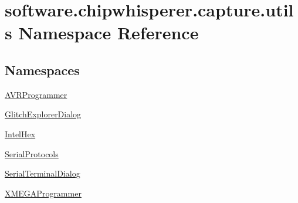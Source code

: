 \hypertarget{namespacesoftware_1_1chipwhisperer_1_1capture_1_1utils}{}\section{software.\+chipwhisperer.\+capture.\+utils Namespace Reference}
\label{namespacesoftware_1_1chipwhisperer_1_1capture_1_1utils}
\subsection*{Namespaces}
\begin{DoxyCompactItemize}
\item 
 \hyperlink{namespacesoftware_1_1chipwhisperer_1_1capture_1_1utils_1_1AVRProgrammer}{A\+V\+R\+Programmer}
\item 
 \hyperlink{namespacesoftware_1_1chipwhisperer_1_1capture_1_1utils_1_1GlitchExplorerDialog}{Glitch\+Explorer\+Dialog}
\item 
 \hyperlink{namespacesoftware_1_1chipwhisperer_1_1capture_1_1utils_1_1IntelHex}{Intel\+Hex}
\item 
 \hyperlink{namespacesoftware_1_1chipwhisperer_1_1capture_1_1utils_1_1SerialProtocols}{Serial\+Protocols}
\item 
 \hyperlink{namespacesoftware_1_1chipwhisperer_1_1capture_1_1utils_1_1SerialTerminalDialog}{Serial\+Terminal\+Dialog}
\item 
 \hyperlink{namespacesoftware_1_1chipwhisperer_1_1capture_1_1utils_1_1XMEGAProgrammer}{X\+M\+E\+G\+A\+Programmer}
\end{DoxyCompactItemize}
